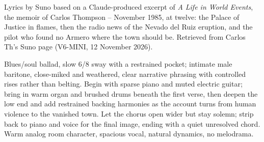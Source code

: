 
\label{sec:the-town-was-gone}
\begin{notes}
Lyrics by Suno based on a Claude-produced excerpt of \emph{A Life in World Events}, the memoir of Carlos Thompson -- November 1985, at twelve: the Palace of Justice in flames, then the radio news of the Nevado del Ruiz eruption, and the pilot who found no Armero where the town should be. Retrieved from Carlos Th's Suno page (V6-MINI, 12 November 2026).
\end{notes}
\begin{style}
Blues/soul ballad, slow 6/8 sway with a restrained pocket; intimate male baritone, close-miked and weathered, clear narrative phrasing with controlled rises rather than belting. Begin with sparse piano and muted electric guitar; bring in warm organ and brushed drums beneath the first verse, then deepen the low end and add restrained backing harmonies as the account turns from human violence to the vanished town. Let the chorus open wider but stay solemn; strip back to piano and voice for the final image, ending with a quiet unresolved chord. Warm analog room character, spacious vocal, natural dynamics, no melodrama.
\end{style}
